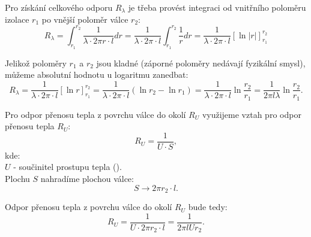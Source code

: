 \documentclass{article}
\begin{document}
\begin{center}
\end{center}

Pro získání celkového odporu $R_\lambda$ je třeba provést integraci od vnitřního poloměru izolace $r_1$ po vnější poloměr válce $r_2$:
$$
    R_\lambda = \int_{r_1}^{r_2} \frac{1}{\lambda \cdot 2 \pi r \cdot l} dr = \frac{1}{\lambda \cdot 2 \pi \cdot l} \int_{r_1}^{r_2} \frac{1}{r} dr = \frac{1}{\lambda \cdot 2 \pi \cdot l} \left[ \ln |r| \right]_{r_1}^{r_2}
$$

Jelikož poloměry $r_1$ a $r_2$ jsou kladné (záporné poloměry nedávají fyzikální smysl), můžeme absolutní hodnotu u logaritmu zanedbat:
$$
    R_\lambda = \frac{1}{\lambda \cdot 2 \pi \cdot l} \left[ \ln r \right]_{r_1}^{r_2} = \frac{1}{\lambda \cdot 2 \pi \cdot l} \left( \ln r_2 - \ln r_1 \right) = \frac{1}{\lambda \cdot 2 \pi \cdot l} \ln \frac{r_2}{r_1} = \frac{1}{2 \pi l \lambda} \ln \frac{r_2}{r_1}.
$$

Pro odpor přenosu tepla z povrchu válce do okolí $R_U$ využijeme vztah pro odpor přenosu tepla $R_U$:
$$
    R_U = \frac{1}{U \cdot S},
$$
kde:\\
$U$ - součinitel prostupu tepla (\ueqWandMinvsqKinv).\\

Plochu $S$ nahradíme plochou válce:
$$
    S \rightarrow 2 \pi r_2 \cdot l.
$$

Odpor přenosu tepla z povrchu válce do okolí $R_U$ bude tedy:
$$
    R_U = \frac{1}{U \cdot 2 \pi r_2 \cdot l} = \frac{1}{2 \pi l U r_2}.
$$
\end{document}

